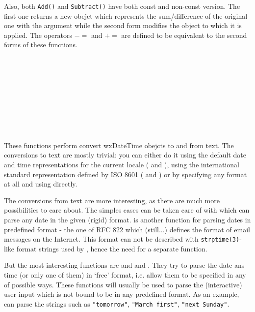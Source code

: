 Also, both {\tt Add()} and {\tt Subtract()} have both const and non-const
version. The first one returns a new obejct which represents the
sum/difference of the original one with the argument while the second form
modifies the object to which it is applied. The operators $-=$ and $+=$ are
defined to be equivalent to the second forms of these functions.

\\
\\
\\
\\
\\
\\
\\
\\


These functions perform convert wxDateTime obejcts to and from text. The
conversions to text are mostly trivial: you can either do it using the default
date and time representations for the current locale (
 and
), using the international standard
representation defined by ISO 8601 (
 and
) or by specifying any format
at all and using  directly.

The conversions from text are more interesting, as there are much more
possibilities to care about. The simples cases can be taken care of with
 which can parse any date in the
given (rigid) format.  is
another function for parsing dates in predefined format - the one of RFC 822
which (still...) defines the format of email messages on the Internet. This
format can not be described with {\tt strptime(3)}-like format strings used by
, hence the need for a separate function.

But the most interesting functions are 
 and 
 and 
. They try to parse the date ans time
(or only one of them) in `free' format, i.e. allow them to be specified in any
of possible ways. These functions will usually be used to parse the
(interactive) user input which is not bound to be in any predefined format. As
an example,  can parse the
strings such as {\tt "tomorrow"}, {\tt "March first"}, {\tt "next Sunday"}.

